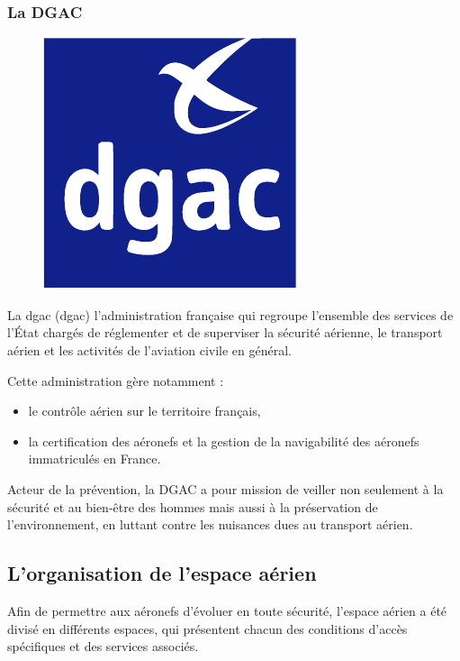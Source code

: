 		\subsubsection{La DGAC}
		\begin{figure}
		\includegraphics[width=0.9\linewidth]{02-Navigation/img/DGAC-logo.pdf} 
		\end{figure}
		La \acrshort{dgac} (\acrlong{dgac}) l'administration française qui regroupe l'ensemble des services de l'État chargés de réglementer et de superviser la sécurité aérienne, le transport aérien et les activités de l'aviation civile en général.
		
		Cette administration gère notamment :
		\begin{itemize}
		  \item le contrôle aérien sur le territoire français,
		  \item la certification des aéronefs et la gestion de la navigabilité des aéronefs immatriculés en France.
	    \end{itemize}
		
		Acteur de la prévention, la DGAC a pour mission de veiller non seulement à la sécurité et au bien-être des hommes mais aussi à la préservation de l'environnement, en luttant contre les nuisances dues au transport aérien.
			
	
	\subsection{L'organisation de l'espace aérien}
	Afin de permettre aux aéronefs d'évoluer en toute sécurité, l'espace aérien a été divisé en différents espaces, qui présentent chacun des conditions d'accès spécifiques et des services associés.
		
